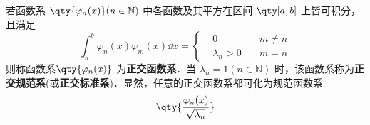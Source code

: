 
若函数系 $\qty{\varphi_n(x)}(n\in \mathbb{N})$ 中各函数及其平方在区间 $\qty[a,b]$ 上皆可积分，且满足
\begin{equation}
\int_a^b\varphi_n(x)\varphi_m(x)\dd x=
\left\{
    \begin{aligned}
    &0\quad &m\neq n\\
   &\lambda_n>0\quad &m=n
    \end{aligned}
\right.
\end{equation}
则称函数系$\qty{\varphi_n(x)}$ 为\textbf{正交函数系}．当 $\lambda_n=1(n\in\mathbb{N})$ 时，该函数系称为\textbf{正交规范系}(或\textbf{正交标准系})．显然，任意的正交函数系都可化为规范函数系 
\begin{equation}
\qty{\frac{\varphi_n(x)}{\sqrt{\lambda_n}}}
\end{equation}

